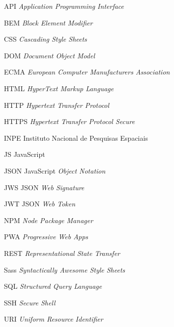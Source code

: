 \documentclass[
	12pt,				%
	openright,			%
	twoside,			%
	a4paper,			%
	english,			%
	brazil				%
	]{abntex2}
\begin{document}
\begin{siglas}
  \item[API] \textit{Application Programming Interface}
  \item[BEM] \textit{Block Element Modifier} 
  \item[CSS] \textit{Cascading Style Sheets}
  \item[DOM] \textit{Document Object Model}
  \item[ECMA] \textit{European Computer Manufacturers Association}
  \item[HTML] \textit{HyperText Markup Language}
  \item[HTTP] \textit{Hypertext Transfer Protocol}
  \item[HTTPS] \textit{Hypertext Transfer Protocol Secure}
  \item[INPE] Instituto Nacional de Pesquisas Espaciais
  \item[JS] JavaScript
  \item[JSON] JavaScript \textit{Object Notation}
  \item[JWS] JSON \textit{Web Signature}
  \item[JWT] JSON \textit{Web Token} 
  \item[NPM] \textit{Node Package Manager} 
  \item[PWA] \textit{Progressive Web Apps}
  \item[REST] \textit{Representational State Transfer}
  \item[Sass] \textit{Syntactically Awesome Style Sheets} 
  \item[SQL] \textit{Structured Query Language}
  \item[SSH] \textit{Secure Shell}  
  \item[URI] \textit{Uniform Resource Identifier}
\end{siglas}


\tableofcontents*
\cleardoublepage
\end{document}

